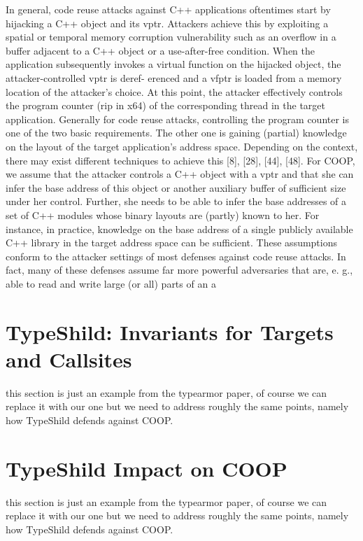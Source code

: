 In general, code reuse attacks against C++ applications
oftentimes start by hijacking a C++ object and its vptr.
Attackers achieve this by exploiting a spatial or temporal
memory corruption vulnerability such as an overflow in a
buffer adjacent to a C++ object or a use-after-free condition.
When the application subsequently invokes a virtual function
on the hijacked object, the attacker-controlled vptr is deref-
erenced and a vfptr is loaded from a memory location of the
attacker’s choice. At this point, the attacker effectively controls
the program counter (rip in x64) of the corresponding thread
in the target application. Generally for code reuse attacks,
controlling the program counter is one of the two basic
requirements. The other one is gaining (partial) knowledge on
the layout of the target application’s address space. Depending
on the context, there may exist different techniques to achieve
this [8], [28], [44], [48].
For COOP, we assume that the attacker controls a C++
object with a vptr and that she can infer the base address of
this object or another auxiliary buffer of sufficient size under
her control. Further, she needs to be able to infer the base
addresses of a set of C++ modules whose binary layouts are
(partly) known to her. For instance, in practice, knowledge on
the base address of a single publicly available C++ library in
the target address space can be sufficient.
These assumptions conform to the attacker settings of most
defenses against code reuse attacks. In fact, many of these
defenses assume far more powerful adversaries that are, e. g.,
able to read and write large (or all) parts of an a

\section{TypeShild: Invariants for Targets and Callsites}
\label{TypeShild: Invariants for Targets and Callsites}
this section is just an example from the typearmor paper, of course we can 
replace it with our one but we need to address roughly the same points, namely
how TypeShild defends against COOP.

\section{TypeShild Impact on COOP}
\label{TypeShild Impact on COOP}
this section is just an example from the typearmor paper, of course we can 
replace it with our one but we need to address roughly the same points, namely
how TypeShild defends against COOP.

